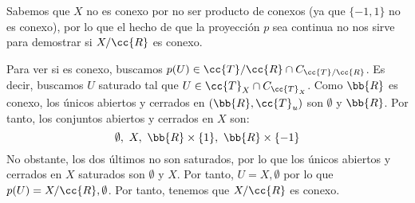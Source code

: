 \documentclass[12pt]{article}
\newcommand{\T}[0]{\cc{T}}
\begin{document}
\begin{ejercicio}[2.5 puntos]
\begin{enumerate}
            Sabemos que $X$ no es conexo por no ser producto de conexos (ya que $\{-1,1\}$ no es conexo),
            por lo que el hecho de que la proyección $p$ sea continua no nos sirve para demostrar si $X/\cc{R}$ es conexo.

            Para ver si es conexo, buscamos $p(U)\in \T/\cc{R}\cap C_{\T/\cc{R}}$.
            Es decir, buscamos $U$ saturado tal que $U\in \T_X\cap C_{\T_X}$.
            Como $\bb{R}$ es conexo, los únicos abiertos y cerrados en $(\bb{R}, \T_u)$ son $\emptyset$ y $\bb{R}$. Por tanto,
            los conjuntos abiertos y cerrados en $X$ son:
            \begin{equation*}
                \emptyset,~X,~\bb{R}\times \{1\},~\bb{R}\times \{-1\}
            \end{equation*}
            No obstante, los dos últimos no son saturados, por lo que
            los únicos abiertos y cerrados en $X$ saturados son $\emptyset$ y $X$.
            Por tanto, $U=X, \emptyset$ por lo que $p(U)=X/\cc{R}, \emptyset$.
            Por tanto, tenemos que $X/\cc{R}$ es conexo.
        \end{enumerate}
    \end{ejercicio}
\end{document}
